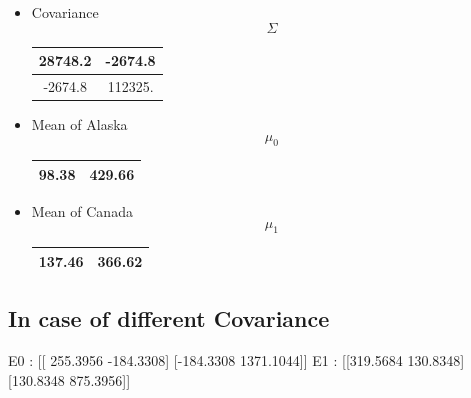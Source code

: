 \documentclass[10pt]{article}
\begin{document}
\begin{itemize}
\item Covariance \[\Sigma\] \begin{center}
\begin{tabular}{ |c|c|}
\hline
 28748.2 & -2674.8  \\
 \hline 
 -2674.8 & 112325. \\
\hline   
\end{tabular}
\end{center}
\item Mean of Alaska $$\mu_0$$ \begin{center}
\begin{tabular}{ |c|c|}
\hline
 98.38 & 429.66  \\
 \hline        
\end{tabular}
\end{center}
\item Mean of Canada $$\mu_1$$ \begin{center}
\begin{tabular}{ |c|c|}
\hline
 137.46 & 366.62  \\
\hline  
\end{tabular}
\end{center}
\end{itemize}


\subsection{In case of different Covariance}
E0 :  [[ 255.3956 -184.3308]
 [-184.3308 1371.1044]]
E1 :  [[319.5684 130.8348]
 [130.8348 875.3956]]
\end{document}
